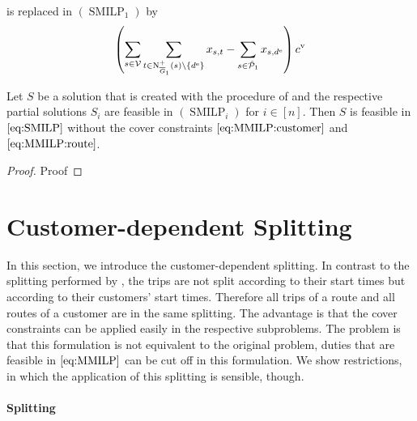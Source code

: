 is replaced in $(\operatorname{SMILP}_1)$ by
\begin{align*}
	\left(\sum_{s\in\mathcal{V}} \sum_{t\in\operatorname{N}^+_{\overline{G}_1}(s)\backslash\left\{d^{\operatorname{e}}\right\}} x_{s,t} - \sum_{s\in\hat{\mathcal{P}}_1} x_{s,d^{\operatorname{e}}}\right)c^{\operatorname{v}}
\end{align*}

\begin{theorem}
\label{thm:equivalence_heuristic_SMILP}

Let $S$ be a solution that is created with the procedure of  and the respective partial solutions $S_i$ are feasible in $(\operatorname{SMILP}_i)$ for ${i\in[n]}$. Then $S$ is feasible in $\eqref{eq:SMILP}$ without the cover constraints $\eqref{eq:MMILP:customer}$ and $\eqref{eq:MMILP:route}$.

\end{theorem}

\begin{proof}

Proof

\end{proof}


\section{Customer-dependent Splitting}
\label{sec:customer_dependent_splitting}

In this section, we introduce the customer-dependent splitting. In contrast to the splitting performed by \cite{Knoll}, the trips are not split according to their start times but according to their customers' start times. Therefore all trips of a route and all routes of a customer are in the same splitting. The advantage is that the cover constraints can be applied easily in the respective subproblems. The problem is that this formulation is not equivalent to the original problem, \ie duties that are feasible in $\eqref{eq:MMILP}$ can be cut off in this formulation. We show restrictions, in which the application of this splitting is sensible, though. 

\paragraph{Splitting} \parfill


